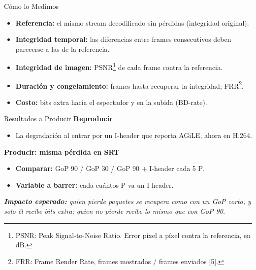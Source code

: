 \documentclass[aspectratio=169, 12pt]{beamer}
\begin{document}
\begin{frame}{Cómo lo Medimos}
    \begin{itemize}
        \item \textbf{Referencia:} el mismo stream decodificado sin pérdidas (integridad original).
        \item \textbf{Integridad temporal:} las diferencias entre frames consecutivos deben parecerse a las de la referencia.
        \item \textbf{Integridad de imagen:} PSNR\footnote{PSNR: Peak Signal-to-Noise Ratio. Error píxel a píxel contra la referencia, en dB.} de cada frame contra la referencia.
        \item \textbf{Duración y congelamiento:} frames hasta recuperar la integridad; FRR\footnote{FRR: Frame Render Rate, frames mostrados / frames enviados [5].}.
        \item \textbf{Costo:} bits extra hacia el espectador y en la subida (BD-rate).
    \end{itemize}
\end{frame}

\begin{frame}{Resultados a Producir}
    \textbf{Reproducir}
    \begin{itemize}
        \item La degradación al entrar por un I-header que reporta AGiLE, ahora en H.264.
    \end{itemize}

    \vspace{0.2cm}
    \textbf{Producir: misma pérdida en SRT}
    \begin{itemize}
        \item \textbf{Comparar:} GoP 90 \enspace / \enspace GoP 30 \enspace / \enspace GoP 90 + I-header cada 5 P.
        \item \textbf{Variable a barrer:} cada cuántos P va un I-header.
    \end{itemize}

    \vspace{0.6cm}
    {\itshape \small \textcolor{SentricaBlue}{
    \textbf{Impacto esperado:} quien pierde paquetes se recupera como con un GoP corto, y solo él recibe bits extra; quien no pierde recibe lo mismo que con GoP 90.
    }\par}
\end{frame}
\end{document}
